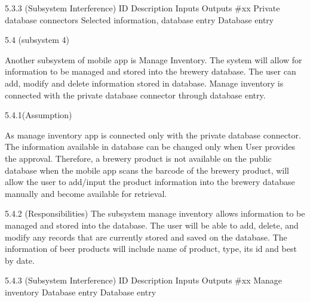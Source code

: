 5.3.3 (Subsystem Interference)
ID 	Description 	Inputs 	Outputs 
#xx 	Private database connectors	Selected information, database entry	Database entry




5.4 (subsystem 4)


Another subsystem of mobile app is Manage Inventory. The system will allow for information to be managed and stored into the brewery database. The user can add, modify and delete information stored in database. Manage inventory is connected with the private database connector through database entry. 

5.4.1(Assumption)

As manage inventory app is connected only with the private database connector. The information available in database can be changed only when User provides the approval.
 Therefore, a brewery product is not available on the public database when the mobile app scans the barcode of the brewery product, will allow the user to add/input the product information into the brewery database manually and become available for retrieval.

5.4.2 (Responsibilities)
The subsystem manage inventory allows information to be managed and stored into the database. The user will be able to add, delete, and modify any records that are currently stored and saved on the database. The information of beer products will include name of product, type, its id and best by date.

5.4.3 (Subsystem Interference)
ID 	Description 	Inputs 	Outputs 
#xx 	Manage inventory	Database entry	Database entry





	

	

